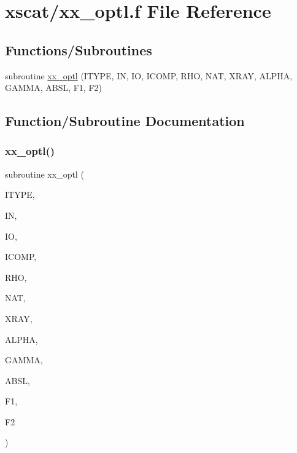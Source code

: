 \hypertarget{xx__optl_8f}{}\section{xscat/xx\+\_\+optl.f File Reference}
\label{xx__optl_8f}
\subsection*{Functions/\+Subroutines}
\begin{DoxyCompactItemize}
\item 
subroutine \hyperlink{xx__optl_8f_a17a7c88dacc6825f5a72f47a7ccc37b1}{xx\+\_\+optl} (I\+T\+Y\+PE, IN, IO, I\+C\+O\+MP, R\+HO, N\+AT, X\+R\+AY, A\+L\+P\+HA, G\+A\+M\+MA, A\+B\+SL, F1, F2)
\end{DoxyCompactItemize}


\subsection{Function/\+Subroutine Documentation}
\mbox{\label{xx__optl_8f_a17a7c88dacc6825f5a72f47a7ccc37b1}} 
\subsubsection{\texorpdfstring{xx\+\_\+optl()}{xx\_optl()}}
{\footnotesize\ttfamily subroutine xx\+\_\+optl (\begin{DoxyParamCaption}\item[{integer}]{I\+T\+Y\+PE,  }\item[{integer}]{IN,  }\item[{integer}]{IO,  }\item[{integer, dimension(nat)}]{I\+C\+O\+MP,  }\item[{}]{R\+HO,  }\item[{integer}]{N\+AT,  }\item[{}]{X\+R\+AY,  }\item[{}]{A\+L\+P\+HA,  }\item[{}]{G\+A\+M\+MA,  }\item[{}]{A\+B\+SL,  }\item[{}]{F1,  }\item[{}]{F2 }\end{DoxyParamCaption})}

